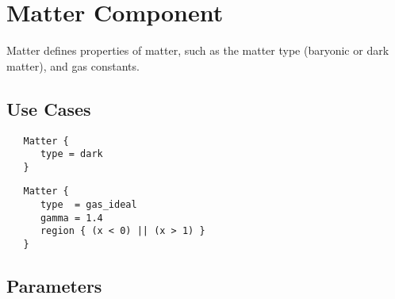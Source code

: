 \section{Matter Component} \label{s:component-matter}

 Matter defines properties of matter, such as the matter type (baryonic
 or dark matter), and gas constants.

\subsection{Use Cases}

\begin{verbatim}
   Matter {
      type = dark
   }
\end{verbatim}

\begin{verbatim}
   Matter {
      type  = gas_ideal
      gamma = 1.4
      region { (x < 0) || (x > 1) }
   }
\end{verbatim}
\subsection{Parameters}

